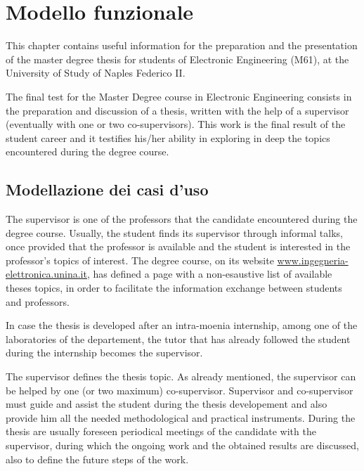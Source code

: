 %
%	 
%

\chapter{Modello funzionale}

This chapter contains useful information for the preparation and the presentation of the master degree thesis for students of Electronic Engineering (M61), at the University of Study of Naples Federico II.

The final test for the Master Degree course in Electronic Engineering consists in the preparation and discussion of a thesis, written with the help of a supervisor (eventually with one or two co-supervisors). This work is the final result of the student career and it testifies his/her ability in exploring in deep the topics encountered during the degree course.

\section{Modellazione dei casi d'uso}

The supervisor is one of the professors that the candidate encountered during the degree course. Usually, the student finds its supervisor through informal talks, once provided that the professor is available and the student is interested in the professor's topics of interest. The degree course, on its website \url{www.ingegneria-elettronica.unina.it}, has defined a page with a non-esaustive list of available theses topics, in order to facilitate the information exchange between students and professors.

In case the thesis is developed after an intra-moenia internship, among one of the laboratories of the departement, the tutor that has already followed the student during the internship becomes the supervisor.

The supervisor defines the thesis topic. As already mentioned, the supervisor can be helped by one (or two maximum) co-supervisor. Supervisor and co-supervisor must guide and assist the student during the thesis developement and also provide him all the needed methodological and practical instruments. During the thesis are usually foreseen periodical meetings of the candidate with the supervisor, during which the ongoing work and the obtained results are discussed, also to define the future steps of the work.


